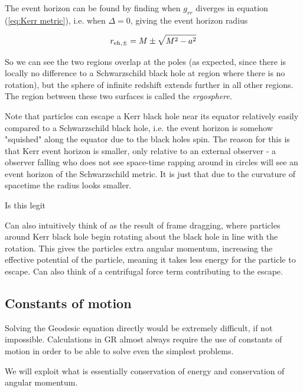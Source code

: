 \documentclass{article}
\begin{document}
The event horizon can be found by finding when $g_{rr}$ diverges in equation (\ref{eq:Kerr metric}), i.e. when $\Delta = 0$, giving the event horizon radius

\begin{equation}
    r_{\rm{eh,}\pm} = M \pm \sqrt{M^2 - a^2}
\end{equation}\label{eq:Kerr event horizon radius}

So we can see the two regions overlap at the poles (as expected, since there is locally no difference to a Schwarzschild black hole at region where there is no rotation), but the sphere of infinite redshift extends further in all other regions. The region between these two surfaces is called the \textit{ergosphere}.

Note that particles can escape a Kerr black hole near its equator relatively easily compared to a Schwarzschild black hole, i.e. the event horizon is somehow "squished" along the equator due to the black holes spin. The reason for this is that Kerr event horizon is smaller, only relative to an external observer - a observer falling who does not see space-time rapping around in circles will see an event horizon of the Schwarzschild metric. It is just that due to the curvature of spacetime the radius looks smaller.


\newcommand\Warning{%
 \makebox[1.4em][c]{%
 \makebox[0pt][c]{\raisebox{.1em}{\small!}}%
 \makebox[0pt][c]{\color{red}\Large$\bigtriangleup$}}}%

\newunicodechar{⚠}{\Warning} Is this legit


Can also intuitively think of as the result of frame dragging, where particles around Kerr black hole begin rotating about the black hole in line with the rotation. This gives the particles extra angular momentum, increasing the effective potential of the particle, meaning it takes less energy for the particle to escape. Can also think of a centrifugal force term contributing to the escape.



\subsection{Constants of motion}
Solving the Geodesic equation directly would be extremely difficult, if not impossible. Calculations in GR almost always require the use of constants of motion in order to be able to solve even the simplest problems.

We will exploit what is essentially conservation of energy and conservation of angular momentum.
\end{document}
